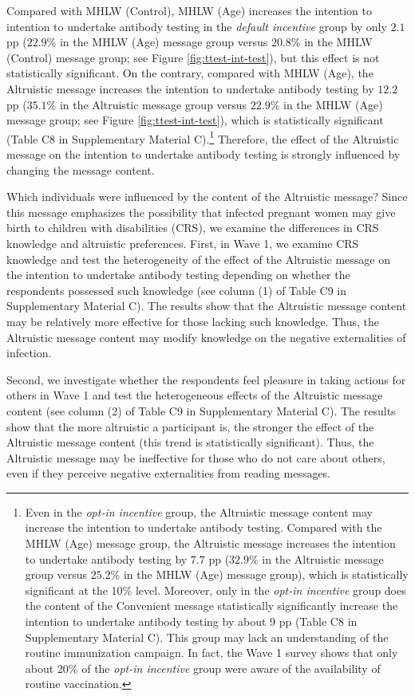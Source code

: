 \documentclass[
  11pt,
  a4paper
]{article}
\begin{document}
Compared with MHLW (Control), MHLW (Age) increases the intention to intention to undertake antibody testing in the \emph{default incentive} group by only \(2.1\) pp (\(22.9\)\% in the MHLW (Age) message group versus \(20.8\)\% in the MHLW (Control) message group; see Figure \ref{fig:ttest-int-test}), but this effect is not statistically significant. On the contrary, compared with MHLW (Age), the Altruistic message increases the intention to undertake antibody testing by \(12.2\) pp (\(35.1\)\% in the Altruistic message group versus \(22.9\)\% in the MHLW (Age) message group; see Figure \ref{fig:ttest-int-test}), which is statistically significant (Table C8 in Supplementary Material C).\footnote{Even in the \emph{opt-in incentive} group, the Altruistic message content may increase the intention to undertake antibody testing. Compared with the MHLW (Age) message group, the Altruistic message increases the intention to undertake antibody testing by \(7.7\) pp (\(32.9\)\% in the Altruistic message group versus \(25.2\)\% in the MHLW (Age) message group), which is statistically significant at the 10\% level. Moreover, only in the \emph{opt-in incentive} group does the content of the Convenient message statistically significantly increase the intention to undertake antibody testing by about 9 pp (Table C8 in Supplementary Material C). This group may lack an understanding of the routine immunization campaign. In fact, the Wave 1 survey shows that only about 20\% of the \emph{opt-in incentive} group were aware of the availability of routine vaccination.} Therefore, the effect of the Altruistic message on the intention to undertake antibody testing is strongly influenced by changing the message content.

Which individuals were influenced by the content of the Altruistic message? Since this message emphasizes the possibility that infected pregnant women may give birth to children with disabilities (CRS), we examine the differences in CRS knowledge and altruistic preferences. First, in Wave 1, we examine CRS knowledge and test the heterogeneity of the effect of the Altruistic message on the intention to undertake antibody testing depending on whether the respondents possessed such knowledge (see column (1) of Table C9 in Supplementary Material C). The results show that the Altruistic message content may be relatively more effective for those lacking such knowledge. Thus, the Altruistic message content may modify knowledge on the negative externalities of infection.

Second, we investigate whether the respondents feel pleasure in taking actions for others in Wave 1 and test the heterogeneous effects of the Altruistic message content (see column (2) of Table C9 in Supplementary Material C). The results show that the more altruistic a participant is, the stronger the effect of the Altruistic message content (this trend is statistically significant). Thus, the Altruistic message may be ineffective for those who do not care about others, even if they perceive negative externalities from reading messages.
\end{document}
